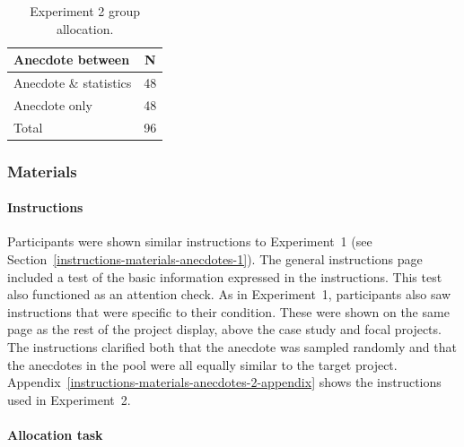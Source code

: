 \documentclass[a4paper, nobind, dvipsnames]{templates/ociamthesis}
\theoremstyle{definition}
\theoremstyle{definition}
\theoremstyle{definition}
\theoremstyle{definition}
\theoremstyle{remark}
\begin{document}
\begin{table}[tbp]

\begin{center}
\begin{threeparttable}

\caption{\label{tab:condition-allocation-anecdotes-2}Experiment 2 group allocation.}

\begin{tabular}{ll}
\toprule
Anecdote between & \multicolumn{1}{c}{N}\\
\midrule
Anecdote \& statistics & 48\\
Anecdote only & 48\\
Total & 96\\
\bottomrule
\end{tabular}

\end{threeparttable}
\end{center}

\end{table}

\subsubsection{Materials}

\paragraph{Instructions}

Participants were shown similar instructions to Experiment~1 (see
Section~\ref{instructions-materials-anecdotes-1}). The general instructions
page included a test of the basic information expressed in the instructions.
This test also functioned as an attention check. As in Experiment~1,
participants also saw instructions that were specific to their condition. These
were shown on the same page as the rest of the project display, above the case
study and focal projects. The instructions clarified both that the anecdote was
sampled randomly and that the anecdotes in the pool were all equally similar to
the target project. Appendix~\ref{instructions-materials-anecdotes-2-appendix}
shows the instructions used in Experiment~2.

\hypertarget{allocation-anecdotes-2}{%
\paragraph{Allocation task}\label{allocation-anecdotes-2}}
\end{document}
